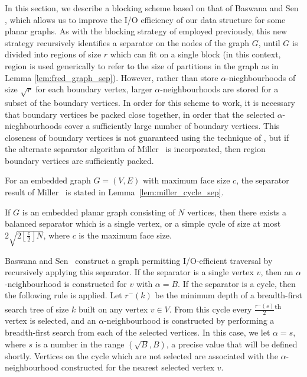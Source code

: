 In this section, we describe a blocking scheme based on that
of Baswana and Sen \cite{DBLP:journals/algorithmica/BaswanaS02}, which
allows us to improve the I/O efficiency of our data structure for some
planar graphs. 
As with the blocking strategy of
\cite{DBLP:conf/soda/AgarwalAMVV98} employed previously, this new
strategy recursively identifies a separator on the nodes of the graph
$G$, until $G$ is divided into regions of size $r$ which can fit on a
single block (in this context, region is used generically to refer to
the size of partitions in the graph as in Lemma
\ref{lem:fred_graph_sep}). However, rather than store
$\alpha$-nieghbourhoods of size $\sqrt{r}$ for each boundary vertex,
larger $\alpha$-neighbourhoods are stored for a subset of the boundary
vertices. 
In order for this scheme to work, it is necessary that
boundary vertices be packed close together, in order that the selected
$\alpha$-nieghbourhoods cover a sufficiently large number of boundary
vertices. This closeness of boundary vertices is not guaranteed using
the technique of \cite{DBLP:conf/soda/AgarwalAMVV98}, but if the
alternate separator algorithm of Miller~\cite{miller_1986} is
incorporated, then region boundary vertices are sufficiently packed.

For an embedded graph $G=(V,E)$ with maximum face size $c$,
the separator result of Miller~\cite{miller_1986} is 
stated in Lemma~\ref{lem:miller_cycle_sep}.

\begin{lemma}\label{lem:miller_cycle_sep}
If $G$ is an embedded planar graph consisting of $N$ vertices, then
there exists a balanced separator which is a single vertex, or a simple cycle
of size at most $2 \sqrt{2 \left\lfloor \frac{c}{2} \right\rfloor N}$,
where $c$ is the maximum face size.
\end{lemma}

Baswana and Sen~\cite{DBLP:journals/algorithmica/BaswanaS02}
construct a graph permitting {I/O}-efficient traversal by recursively
applying this separator.
If the separator is a single vertex $v$, then an $\alpha$-neighbourhood
is constructed for $v$ with $\alpha = B$. 
If the separator is a cycle, then the following rule is applied.
Let $r^{-}(k)$ be the minimum depth of a
breadth-first search tree of size $k$ built on any vertex $v \in
V$.
From this cycle every $\frac{r^{-}(s)}{2}$\textsuperscript{th}
vertex is selected, and an $\alpha$-neighbourhood is constructed 
by performing a breadth-first search from each of the selected 
vertices.
In this case, we let $\alpha=s$, where $s$ is
a number in the range $(\sqrt{B},B)$, a precise value that will be
defined shortly.
Vertices on the cycle which are not selected are associated with the
$\alpha$-neighbourhood constructed for the nearest selected vertex $v$.

